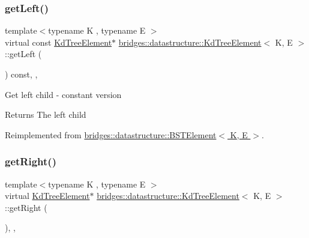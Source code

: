 \subsubsection{\texorpdfstring{get\+Left()}{getLeft()}\hspace{0.1cm}{\footnotesize\ttfamily [2/2]}}
{\footnotesize\ttfamily template$<$typename K , typename E $>$ \\
virtual const \hyperlink{classbridges_1_1datastructure_1_1_kd_tree_element}{Kd\+Tree\+Element}$\ast$ \hyperlink{classbridges_1_1datastructure_1_1_kd_tree_element}{bridges\+::datastructure\+::\+Kd\+Tree\+Element}$<$ K, E $>$\+::get\+Left (\begin{DoxyParamCaption}{ }\end{DoxyParamCaption}) const\hspace{0.3cm}{\ttfamily [inline]}, {\ttfamily [override]}, {\ttfamily [virtual]}}

Get left child -\/ constant version

\begin{DoxyReturn}{Returns}
The left child 
\end{DoxyReturn}


Reimplemented from \hyperlink{classbridges_1_1datastructure_1_1_b_s_t_element_abac324ef0b480420bd82ecfe4501d60d}{bridges\+::datastructure\+::\+B\+S\+T\+Element$<$ K, E $>$}.

\mbox{\label{classbridges_1_1datastructure_1_1_kd_tree_element_a366e3b0987169220d3a145043be2373d}} 
\subsubsection{\texorpdfstring{get\+Right()}{getRight()}\hspace{0.1cm}{\footnotesize\ttfamily [1/2]}}
{\footnotesize\ttfamily template$<$typename K , typename E $>$ \\
virtual \hyperlink{classbridges_1_1datastructure_1_1_kd_tree_element}{Kd\+Tree\+Element}$\ast$ \hyperlink{classbridges_1_1datastructure_1_1_kd_tree_element}{bridges\+::datastructure\+::\+Kd\+Tree\+Element}$<$ K, E $>$\+::get\+Right (\begin{DoxyParamCaption}{ }\end{DoxyParamCaption})\hspace{0.3cm}{\ttfamily [inline]}, {\ttfamily [override]}, {\ttfamily [virtual]}}

